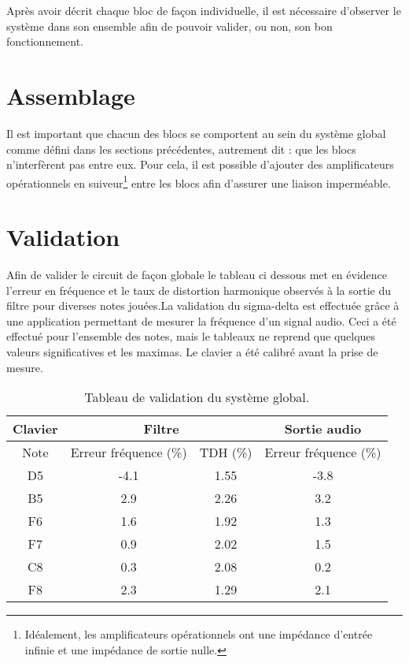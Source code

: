 
\usepackage{array}
Après avoir décrit chaque bloc de façon individuelle, il est nécessaire d'observer le système dans son ensemble afin de pouvoir valider, ou non, son bon fonctionnement. 

\section{Assemblage}
Il est important que chacun des blocs se comportent au sein
du système global comme défini dans les sections précédentes, 
autrement dit : que les blocs n'interfèrent pas entre eux.
Pour cela, il est possible d'ajouter des amplificateurs 
opérationnels en suiveur\footnote{Idéalement, les amplificateurs opérationnels
ont une impédance d'entrée infinie et une impédance de sortie nulle.} 
entre les blocs afin d'assurer une liaison imperméable. 

\section{Validation}
Afin de valider le circuit de façon globale le tableau ci
dessous met en évidence l'erreur en fréquence et le taux de
distortion harmonique observés à la sortie du filtre pour
diverses notes jouées.La validation du sigma-delta est
effectuée grâce à une application  permettant de
mesurer la fréquence d'un signal audio. Ceci a été effectué
pour l'ensemble des notes, mais le tableaux ne reprend que
quelques valeurs significatives et les maximas. Le clavier a
été calibré avant la prise de mesure.

\begin{table}
	\centering
	\begin{tabular}{|c|c|c|c|}
		\hline
		Clavier &  \multicolumn{2}{c|}{Filtre} &  Sortie audio \\
		 \hline
		Note &  Erreur fréquence (\%) & TDH (\%) &  Erreur fréquence (\%) \\
		\hline
		D5 &  -4.1 & 1.55 & -3.8\\
		B5 &  2.9 & 2.26 & 3.2\\
		F6 &  1.6 & 1.92 & 1.3\\
		F7 &  0.9 & 2.02 & 1.5\\
		C8 &  0.3 & 2.08 & 0.2\\
		F8 &  2.3 & 1.29 & 2.1\\
		\hline
	\end{tabular}
	\caption{Tableau de validation du système global.}
	\label{tab:tab-global}
\end{table}


